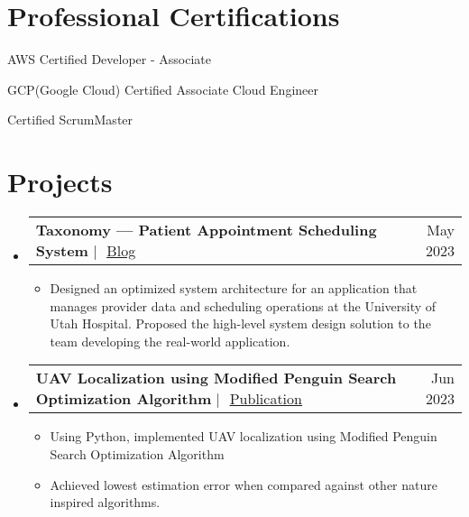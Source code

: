 \documentclass[letterpaper]{article}
\makeatletter
\newcommand{\resumeItem}[1]{
  \item\small{
    {#1 \vspace{-2pt}}
  }
}
\newcommand{\resumeProjectHeading}[2]{
    \item
    \begin{tabular*}{1\textwidth}{l@{\extracolsep{\fill}}r}
      \small#1 & #2 \\
    \end{tabular*}\vspace{-7pt}
}
\newcommand{\resumeSubHeadingListStart}{\begin{itemize}[leftmargin=0in, label={}]}
\newcommand{\resumeItemListStart}{\begin{itemize}}
\newcommand{\resumeItemListEnd}{\end{itemize}\vspace{-5pt}}
\makeatother
\begin{document}
\vspace{-5pt}
\section{Professional Certifications}
    \resumeItemListStart 
    \small{
        \resumeItem{AWS Certified Developer - Associate} \vspace{-3pt}
        \resumeItem{GCP(Google Cloud) Certified Associate Cloud Engineer}\vspace{-3pt}
        \resumeItem{Certified ScrumMaster}\vspace{-3pt}
        }
    \resumeItemListEnd

\section{Projects}
\resumeSubHeadingListStart
\resumeProjectHeading
      {\textbf{Taxonomy — Patient Appointment Scheduling System} $|$ 
      {\faIcon{link}}$ $
      \underline{\href{https://medium.com/@siddartha.muppalla/provider-taxonomy-patient-appointment-scheduler-a1538c10f7c0}{Blog}}\vspace{1pt}}{\small{May 2023}}
        \resumeItemListStart
            \resumeItem{Designed an optimized system architecture for an application that manages provider data and scheduling operations at the University of Utah Hospital. Proposed the high-level system design solution to the team developing the real-world application.}
            \resumeItemListEnd
            
            \vspace{5pt}
      \resumeProjectHeading
      {\textbf{UAV Localization using Modified Penguin Search Optimization Algorithm} $|$ 
      {\faIcon{link}}$ $
      \underline{\href{https://doi.org/10.1016/j.compeleceng.2023.108757}{Publication}}\vspace{1pt}}{\small{Jun 2023}}
        \resumeItemListStart
            \resumeItem{Using Python, implemented UAV localization using Modified Penguin Search Optimization Algorithm}
            \resumeItem{Achieved lowest estimation error when compared against other nature inspired algorithms.}
      \resumeItemListEnd
    \end{itemize}
      
\end{document}
